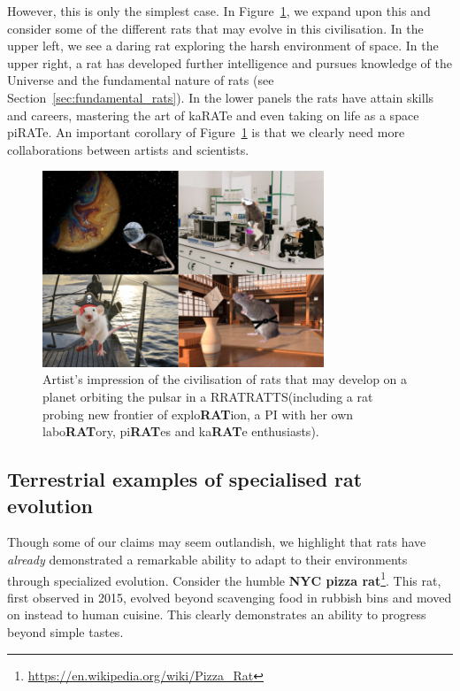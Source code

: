 \documentclass[twocolumn, twocolappendix]{aastex631}
\newcommand{\binaryRAT}{RRATRATTS\xspace}
\begin{document}
However, this is only the simplest case. In Figure~\ref{fig:rat-civ}, we expand upon this and consider some of the different rats that may evolve in this civilisation. In the upper left, we see a daring rat exploring the harsh environment of space. In the upper right, a rat has developed further intelligence and pursues knowledge of the Universe and the fundamental nature of rats (see Section~\ref{sec:fundamental_rats}). In the lower panels the rats have attain skills and careers, mastering the art of kaRATe and even taking on life as a space piRATe. An important corollary of Figure~\ref{fig:rat-civ} is that we clearly need more collaborations between artists and scientists.

\begin{figure}[htb]
    \centering
    \includegraphics[width=0.75\textwidth]{paper/figures/sam_rats.png}
    \caption{Artist's impression of the civilisation of rats that may develop on a planet orbiting the pulsar in a \binaryRAT (including a rat probing new frontier of explo\textbf{RAT}ion, a PI with her own labo\textbf{RAT}ory, pi\textbf{RAT}es and ka\textbf{RAT}e enthusiasts).}
    \label{fig:rat-civ}
\end{figure}

\subsection{Terrestrial examples of specialised rat evolution}
Though some of our claims may seem outlandish, we highlight that rats have \textit{already} demonstrated a remarkable ability to adapt to their environments through specialized evolution. Consider the humble \textbf{NYC pizza rat}\footnote{\url{https://en.wikipedia.org/wiki/Pizza_Rat}}. This rat, first observed in 2015, evolved beyond scavenging food in rubbish bins and moved on instead to human cuisine. This clearly demonstrates an ability to progress beyond simple tastes.
\end{document}
